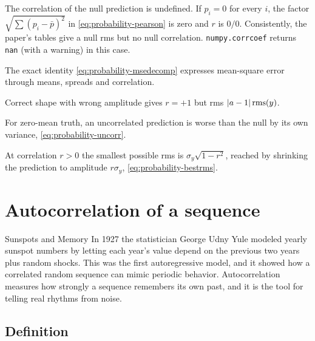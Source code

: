 \begin{pitfall}
The correlation of the null prediction is undefined. If $p_i=0$ for every $i$, the factor $\sqrt{\sum(p_i-\bar p)^2}$ in \cref{eq:probability-pearson} is zero and $r$ is $0/0$. Consistently, the paper's tables give a null rms but no null correlation. \texttt{numpy.corrcoef} returns \texttt{nan} (with a warning) in this case.
\end{pitfall}

\begin{keyideas}

\item The exact identity \cref{eq:probability-msedecomp} expresses mean-square error through means, spreads and correlation.
\item Correct shape with wrong amplitude gives $r=+1$ but rms $\left\lvert a-1\right\rvert\mathrm{rms}(y)$.
\item For zero-mean truth, an uncorrelated prediction is worse than the null by its own variance, \cref{eq:probability-uncorr}.
\item At correlation $r>0$ the smallest possible rms is $\sigma_y\sqrt{1-r^2}$, reached by shrinking the prediction to amplitude $r\sigma_y$, \cref{eq:probability-bestrms}.

\end{keyideas}

\section{Autocorrelation of a sequence}\label{sec:probability-autocorr}
\begin{didyouknow}{Sunspots and Memory}
In 1927 the statistician George Udny Yule modeled yearly sunspot numbers by letting each year's value depend on the previous two years plus random shocks. This was the first autoregressive model, and it showed how a correlated random sequence can mimic periodic behavior. Autocorrelation measures how strongly a sequence remembers its own past, and it is the tool for telling real rhythms from noise.
\end{didyouknow}

\subsection{Definition}

